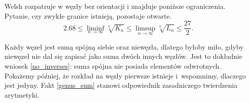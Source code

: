 Welsh rozpatruje w \cite{welsh92} węzły bez orientacji i znajduje poniższe ograniczenia.
Pytanie, czy zwykłe granice istnieją, pozostaje otwarte.
\begin{equation}
    2.68 \le \liminf_{n \to \infty}  \sqrt[n]{K_n} \le \limsup_{n \to \infty} \sqrt[n]{L_n} \le \frac {27}{2}.
\end{equation}


Każdy węzeł jest sumą spójną siebie oraz niewęzła, dlatego byłoby miło, gdyby niewęzeł nie dał się zapisać jako suma dwóch innych węzłów.
Jest to dokładnie wniosek \ref{no_inverses}: suma spójna nie posiada elementów odwrotnych.
Pokażemy później, że rozkład na węzły pierwsze istnieje i~wspomnimy, dlaczego jest jedyny.
Fakt \ref{genus_sum} stanowi odpowiednik zasadniczego twierdzenia arytmetyki.

